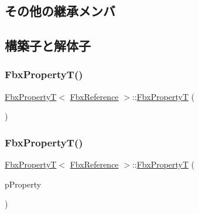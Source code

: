 \subsection*{その他の継承メンバ}


\subsection{構築子と解体子}
\mbox{\label{class_fbx_property_t_3_01_fbx_reference_01_4_a0e52b59786dc43fcc7e6dc078fb4d609}} 
\subsubsection{\texorpdfstring{Fbx\+Property\+T()}{FbxPropertyT()}\hspace{0.1cm}{\footnotesize\ttfamily [1/2]}}
{\footnotesize\ttfamily \hyperlink{class_fbx_property_t}{Fbx\+PropertyT}$<$ \hyperlink{fbxtypes_8h_a44df6a2eec915cf27cd481e5c5e48a24}{Fbx\+Reference} $>$\+::\hyperlink{class_fbx_property_t}{Fbx\+PropertyT} (\begin{DoxyParamCaption}{ }\end{DoxyParamCaption})}

\mbox{\label{class_fbx_property_t_3_01_fbx_reference_01_4_a5fadc2ddbd221db69d2907c4745ec6b8}} 
\subsubsection{\texorpdfstring{Fbx\+Property\+T()}{FbxPropertyT()}\hspace{0.1cm}{\footnotesize\ttfamily [2/2]}}
{\footnotesize\ttfamily \hyperlink{class_fbx_property_t}{Fbx\+PropertyT}$<$ \hyperlink{fbxtypes_8h_a44df6a2eec915cf27cd481e5c5e48a24}{Fbx\+Reference} $>$\+::\hyperlink{class_fbx_property_t}{Fbx\+PropertyT} (\begin{DoxyParamCaption}\item[{const \hyperlink{class_fbx_property}{Fbx\+Property} \&}]{p\+Property }\end{DoxyParamCaption})}

